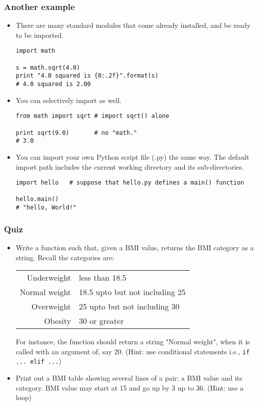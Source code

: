 \documentclass{beamer}
\begin{document}
\begin{frame}[fragile]
\frametitle{Another example}
\begin{itemize}
\item There are many standard modules that come
      already installed, and be ready to be imported.
\begin{lstlisting}[escapechar=\%]
import math

s = math.sqrt(4.0)
print "4.0 squared is {0:.2f}".format(s)
# 4.0 squared is 2.00
\end{lstlisting}
\item You can selectively import as well.
\begin{lstlisting}
from math import sqrt # import sqrt() alone

print sqrt(9.0)       # no "math."
# 3.0
\end{lstlisting}
\item You can import your own Python script file (.py)
      the same way. The default import path includes
      the current working directory and its sub-directories.
\begin{lstlisting}
import hello   # suppose that hello.py defines a main() function

hello.main()
# "hello, World!"
\end{lstlisting}
\end{itemize}
\end{frame}

\begin{frame}[fragile]
\frametitle{Quiz}
\begin{itemize}
\item Write a function such that, given a BMI value, 
    returns the BMI category as a string. Recall the
    categories are:
{\tiny
\begin{table}[h]
\begin{tabular}{r l}
Underweight & less than 18.5 \\ 
Normal weight & 18.5 upto but not including 25 \\
Overweight & 25 upto but not including 30 \\
Obesity & 30 or greater \\
\end{tabular}
\end{table}
}
For instance, the function should return a string 
"Normal weight", when it is called with an argument
of, say 20. (Hint: use conditional statements 
i.e., \lstinline{if ... elif ...})
 
\item Print out a BMI table showing several lines of
    a pair: a BMI value and its category. BMI value
    may start at 15 and go up by 3 up to 36.
    (Hint: use a loop)
\end{itemize}
\end{frame}
\end{document}
